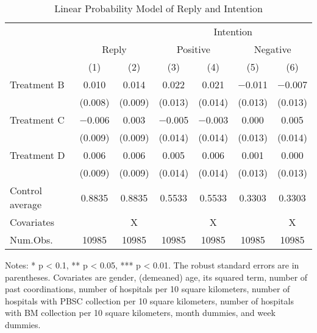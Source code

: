 \documentclass[12pt, a4paper]{article}
\begin{document}
\begin{table}[H]

\caption{\label{tab:reg-stock}Linear Probability Model of Reply and Intention}
\centering
\fontsize{9}{11}\selectfont
\begin{threeparttable}
\begin{tabular}[t]{lcccccc}
\toprule
\multicolumn{3}{c}{ } & \multicolumn{4}{c}{Intention} \\
\cmidrule(l{3pt}r{3pt}){4-7}
\multicolumn{1}{c}{ } & \multicolumn{2}{c}{Reply} & \multicolumn{2}{c}{Positive} & \multicolumn{2}{c}{Negative} \\
\cmidrule(l{3pt}r{3pt}){2-3} \cmidrule(l{3pt}r{3pt}){4-5} \cmidrule(l{3pt}r{3pt}){6-7}
  & (1) & (2) & (3) & (4) & (5) & (6)\\
\midrule
Treatment B & \num{0.010} & \num{0.014} & \num{0.022} & \num{0.021} & \num{-0.011} & \num{-0.007}\\
 & (\num{0.008}) & (\num{0.009}) & (\num{0.013}) & (\num{0.014}) & (\num{0.013}) & (\num{0.013})\\
Treatment C & \num{-0.006} & \num{0.003} & \num{-0.005} & \num{-0.003} & \num{0.000} & \num{0.005}\\
 & (\num{0.009}) & (\num{0.009}) & (\num{0.014}) & (\num{0.014}) & (\num{0.013}) & (\num{0.014})\\
Treatment D & \num{0.006} & \num{0.006} & \num{0.005} & \num{0.006} & \num{0.001} & \num{0.000}\\
 & (\num{0.009}) & (\num{0.009}) & (\num{0.014}) & (\num{0.014}) & (\num{0.013}) & (\num{0.013})\\
\midrule
Control average & 0.8835 & 0.8835 & 0.5533 & 0.5533 & 0.3303 & 0.3303\\
Covariates &  & X &  & X &  & X\\
Num.Obs. & \num{10985} & \num{10985} & \num{10985} & \num{10985} & \num{10985} & \num{10985}\\
\bottomrule
\end{tabular}
\begin{tablenotes}
\item Notes: * p < 0.1, ** p < 0.05, *** p < 0.01. The robust standard errors are in parentheses. Covariates are gender, (demeaned) age, its squared term, number of past coordinations, number of hospitals per 10 square kilometers, number of hospitals with PBSC collection per 10 square kilometers, number of hospitals with BM collection per 10 square kilometers, month dummies, and week dummies.
\end{tablenotes}
\end{threeparttable}
\end{table}
\end{document}
